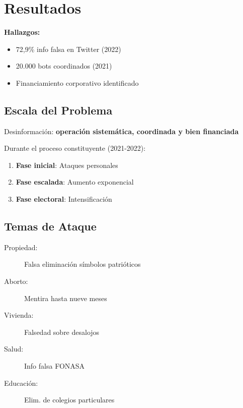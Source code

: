 
\hypertarget{sec4}{\section{Resultados}}\label{sec4}

\begin{keypoint}
\textbf{Hallazgos:}
\begin{itemize}
    \itemsep=0.12cm
    \item 72,9\% info falsa en Twitter (2022)
    \item 20.000 bots coordinados (2021)
    \item Financiamiento corporativo identificado
\end{itemize}
\end{keypoint}

\subsection{Escala del Problema}

\begin{highlight}
Desinformación: \textbf{operación sistemática, coordinada y bien financiada}
\end{highlight}

Durante el proceso constituyente (2021-2022):

\begin{enumerate}
    \itemsep=0.12cm
    \item \textbf{Fase inicial}: Ataques personales
    \item \textbf{Fase escalada}: Aumento exponencial
    \item \textbf{Fase electoral}: Intensificación
\end{enumerate}

\subsection{Temas de Ataque}

\begin{description}
    \item[Propiedad:] Falsa eliminación símbolos patrióticos
    \item[Aborto:] Mentira hasta nueve meses
    \item[Vivienda:] Falsedad sobre desalojos
    \item[Salud:] Info falsa FONASA
    \item[Educación:] Elim. de colegios particulares
\end{description}


